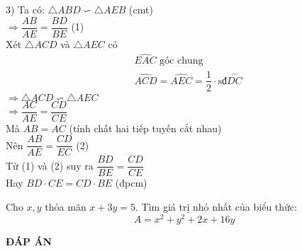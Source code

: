 \begin{ex}
{{	}
	3) Ta có: $\triangle ABD \backsim  \triangle AEB$ (cmt)\\
	$\Rightarrow \dfrac{AB}{AE}=\dfrac{BD}{BE}$ (1)\\
	Xét $\triangle ACD$ và $\triangle AEC$ có
	\begin{align*}
	& \widehat{EAC} \text{ góc chung}\\
	& \widehat{ACD}=\widehat{AEC}=\dfrac{1}{2} \cdot \text{sđ}\stackrel\frown{DC}
	\end{align*}
	$\Rightarrow \triangle ACD \backsim  \triangle AEC$\\
	$\Rightarrow \dfrac{AC}{AE}=\dfrac{CD}{CE}$ \\
	Mà $AB = AC$ (tính chất hai tiếp tuyến cắt nhau)\\
	Nên $\dfrac{AB}{AE}=\dfrac{CD}{EC}$ (2)\\
	Từ (1) và (2) suy ra $\dfrac{BD}{BE}=\dfrac{CD}{CE}$\\
	Hay $BD\cdot CE=CD \cdot BE$ (đpcm)	
	}
\end{ex}

\begin{ex} %
Cho $x, y$ thỏa mãn $x+3y=5$. Tìm giá trị nhỏ nhất của biểu thức:
$$A=x^2+y^2+2x+16y$$	 
\end{ex}
\newpage
\begin{center}
	\textbf{ĐÁP ÁN}
\end{center}
\begin{multicols}{10}
	 
\end{multicols}